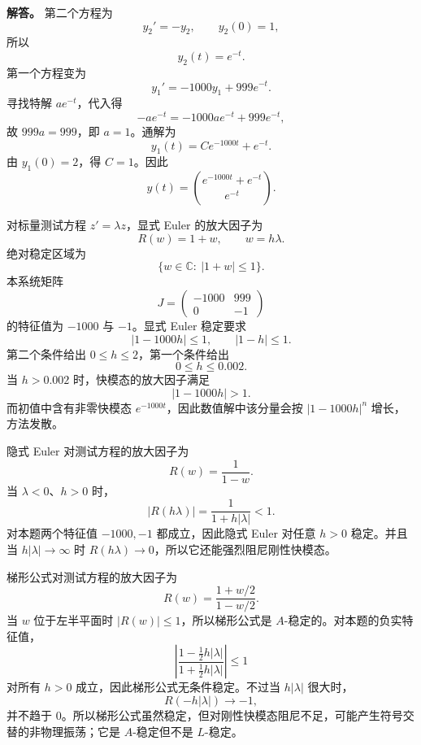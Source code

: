 ﻿\documentclass[UTF8,12pt]{ctexart}
\begin{document}
\begin{enumerate}[label=\textbf{\arabic*.},leftmargin=2.2em]
\textbf{解答。} 第二个方程为
\[
y_2'=-y_2,\qquad y_2(0)=1,
\]
所以
\[
y_2(t)=e^{-t}.
\]
第一个方程变为
\[
y_1'=-1000y_1+999e^{-t}.
\]
寻找特解 \(ae^{-t}\)，代入得
\[
-ae^{-t}=-1000ae^{-t}+999e^{-t},
\]
故 \(999a=999\)，即 \(a=1\)。通解为
\[
y_1(t)=Ce^{-1000t}+e^{-t}.
\]
由 \(y_1(0)=2\)，得 \(C=1\)。因此
\[
\boxed{y(t)=\binom{e^{-1000t}+e^{-t}}{e^{-t}}.}
\]

对标量测试方程 \(z'=\lambda z\)，显式 Euler 的放大因子为
\[
R(w)=1+w,\qquad w=h\lambda.
\]
绝对稳定区域为
\[
\{w\in\mathbb C:\ |1+w|\le1\}.
\]
本系统矩阵
\[
J=\begin{pmatrix}-1000&999\\0&-1\end{pmatrix}
\]
的特征值为 \(-1000\) 与 \(-1\)。显式 Euler 稳定要求
\[
|1-1000h|\le1,\qquad |1-h|\le1.
\]
第二个条件给出 \(0\le h\le2\)，第一个条件给出
\[
0\le h\le0.002.
\]
当 \(h>0.002\) 时，快模态的放大因子满足
\[
|1-1000h|>1.
\]
而初值中含有非零快模态 \(e^{-1000t}\)，因此数值解中该分量会按 \(|1-1000h|^n\) 增长，方法发散。

隐式 Euler 对测试方程的放大因子为
\[
R(w)=\frac1{1-w}.
\]
当 \(\lambda<0\)、\(h>0\) 时，
\[
|R(h\lambda)|=\frac1{1+h|\lambda|}<1.
\]
对本题两个特征值 \(-1000,-1\) 都成立，因此隐式 Euler 对任意 \(h>0\) 稳定。并且当 \(h|\lambda|\to\infty\) 时 \(R(h\lambda)\to0\)，所以它还能强烈阻尼刚性快模态。

梯形公式对测试方程的放大因子为
\[
R(w)=\frac{1+w/2}{1-w/2}.
\]
当 \(w\) 位于左半平面时 \(|R(w)|\le1\)，所以梯形公式是 \(A\)-稳定的。对本题的负实特征值，
\[
\left|\frac{1-\frac12h|\lambda|}{1+\frac12h|\lambda|}\right|\le1
\]
对所有 \(h>0\) 成立，因此梯形公式无条件稳定。不过当 \(h|\lambda|\) 很大时，
\[
R(-h|\lambda|)\to -1,
\]
并不趋于 \(0\)。所以梯形公式虽然稳定，但对刚性快模态阻尼不足，可能产生符号交替的非物理振荡；它是 \(A\)-稳定但不是 \(L\)-稳定。
\end{enumerate}
\end{document}
